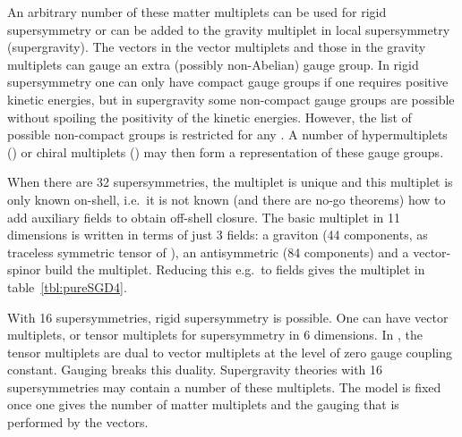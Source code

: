 \documentclass[a4paper,11pt,twoside]{article}
\providecommand{\Red}[1]{#1}
\providecommand{\Maroon}[1]{#1}
\providecommand{\SO}{\mathop{\rm SO}}
\begin{document}
An arbitrary number of these matter multiplets can be used for rigid
supersymmetry or can be added to the gravity multiplet in local
supersymmetry (supergravity). The vectors in the vector multiplets and
those in the gravity multiplets can gauge an extra (possibly non-Abelian)
gauge group. In rigid supersymmetry one can only have compact gauge
groups if one requires positive kinetic energies, but in supergravity
some non-compact gauge groups are possible without spoiling the
positivity of the kinetic energies. However, the list of possible
non-compact groups is restricted for any \coordHE{}. A number of hypermultiplets
(\coordHE{}) or chiral multiplets (\coordHE{}) may then form a representation of
these gauge groups.

When there are 32 supersymmetries, the multiplet is unique and this
multiplet is only known on-shell, i.e.\ it is not known (and there are
no-go theorems) how to add auxiliary fields to obtain off-shell closure.
The basic multiplet in 11 dimensions is written in terms of just 3
fields: a graviton \myHighlight{$\Maroon{g_{\mu \nu }}$}\coordHE{} (44 components, as traceless
symmetric tensor of \myHighlight{$\SO(9)$}\coordHE{}), an antisymmetric \myHighlight{$\Maroon{A_{\mu \nu \rho
}}$}\coordHE{} (84 components) and a vector-spinor \myHighlight{$\Red{\psi _\mu}$}\coordHE{} build the
\coordHE{} multiplet. Reducing this e.g.\ to \coordHE{} fields gives the \coordHE{}
multiplet in table~\ref{tbl:pureSGD4}.

With 16 supersymmetries, rigid supersymmetry is possible. One can have
vector multiplets, or tensor multiplets for \coordHE{} supersymmetry in 6
dimensions. In \coordHE{}, the tensor multiplets are dual to vector multiplets
at the level of zero gauge coupling constant. Gauging breaks this
duality. Supergravity theories with 16 supersymmetries may contain a
number of these multiplets. The model is fixed once one gives the number
of matter multiplets and the gauging that is performed by the vectors.
\end{document}
